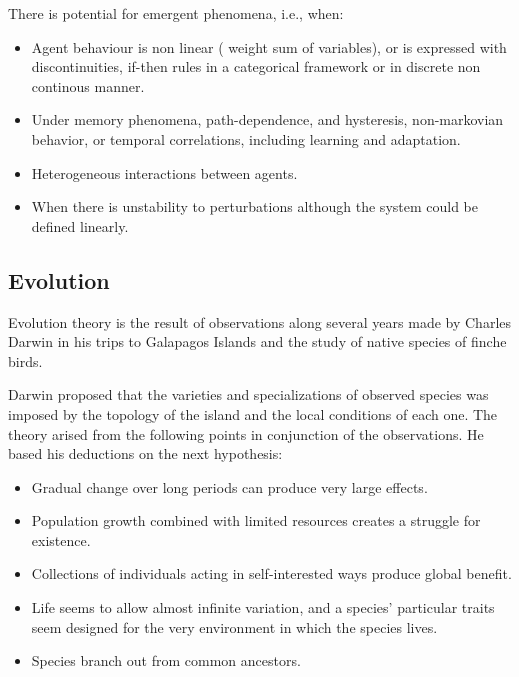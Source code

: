 \documentclass[11pt,oneside,a4paper,openright]{report}
\begin{document}
There is potential for emergent phenomena, i.e., when: 
\begin{itemize}
 \item Agent behaviour is non linear ( weight sum of variables), or is expressed with discontinuities, if-then rules in a categorical framework or in discrete non continous manner.
 \item Under memory phenomena, path-dependence, and hysteresis, non-markovian behavior, or temporal correlations, including learning and adaptation. 
 \item Heterogeneous interactions between agents.
 \item When there is unstability to perturbations although the system could be defined linearly.
\end{itemize}


\subsection{Evolution}

Evolution theory is the result of observations along several years made by Charles Darwin in his trips to Galapagos Islands and the study of native species of finche birds. 

Darwin proposed that the varieties and specializations of observed species was imposed by the topology of the 
island and the local conditions of each one. The theory arised from the following points in conjunction of the observations. He based his deductions on the next hypothesis:
\begin{itemize}
	\item Gradual change over long periods can produce very large effects.
	\item Population growth combined with limited resources creates a struggle for
	existence. 
	\item Collections of individuals acting in self-interested ways produce
	global benefit. 
	\item Life seems to allow almost infinite variation, and a species’
	particular traits seem designed for the very environment in which the species
	lives. 
	\item Species branch out from common ancestors.
\end{itemize}
\end{document}
